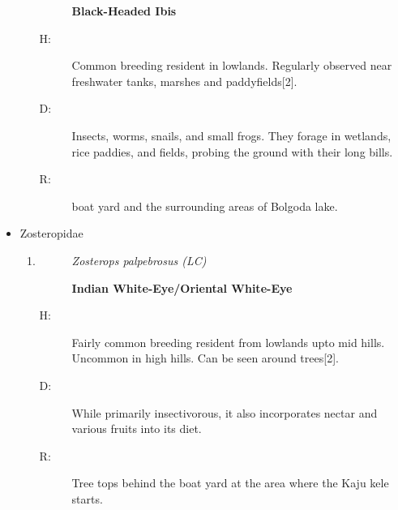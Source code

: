 \begin{itemize}
\begin{enumerate}
\begin{description}
\textbf{Black{-}Headed Ibis}%
\end{description}%
\begin{description}%
\item[H: ]%
Common breeding resident in lowlands. Regularly observed near freshwater tanks, marshes and paddyfields{[}2{]}.%
\item[D: ]%
Insects, worms, snails, and small frogs. They forage in wetlands, rice paddies, and fields, probing the ground with their long bills.%
\item[R: ]%
boat yard and the surrounding areas of Bolgoda lake.%
\end{description}%
\end{enumerate}%
\item%
Zosteropidae%
\begin{enumerate}%
\item%
\begin{description}%
\item[]%
\textit{Zosterops palpebrosus (LC)}%
\item[]%
\textbf{Indian White{-}Eye/Oriental White{-}Eye}%
\end{description}%
\begin{description}%
\item[H: ]%
Fairly common breeding resident from lowlands upto mid hills. Uncommon in high hills. Can be seen around trees{[}2{]}.%
\item[D: ]%
While primarily insectivorous, it also incorporates nectar and various fruits into its diet.%
\item[R: ]%
Tree tops behind the boat yard at the area where the Kaju kele starts.%
\end{description}%
\end{enumerate}%
\end{itemize}